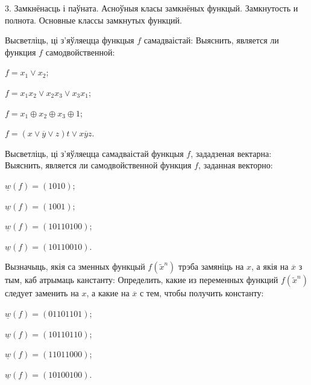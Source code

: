 \documentclass[12pt, a4paper]{article}
\begin{document}
\biLangHeader
{3. Замкнёнасць і паўната. Асноўныя класы замкнёных функцый.}
{Замкнутость и полнота. Основные классы замкнутых функций.}

\begin{problemList}

\problemItemWithCommonPart
{Высветліць, ці з'яўляецца функцыя $f$ самадваістай:}
{Выяснить, является ли функция $f$ самодвойственной:}
{%
\begin{belarusianEnumerateMulticol}
    \item $f=x_1\vee x_2$;
    \item $f=x_1x_2\vee x_2x_3\vee x_3x_1$;
    \item $f=x_1\oplus x_2\oplus x_3\oplus 1$;
    \item $f=(x\vee \overline{y}\vee z)t\vee x\overline{y}z$.
\end{belarusianEnumerateMulticol} 
}

\smallskip

\problemItemWithCommonPart
{Высветліць, ці з'яўляецца самадваістай функцыя $f$, зададзеная вектарна:}
{Выяснить, является ли самодвойственной функция $f$, заданная векторно:}
{%
\begin{belarusianEnumerateMulticol}
    \item $\underline{w}(f)=(1010)$;
    \item $\underline{w}(f)=(1001)$;
    \item $\underline{w}(f)=(10110100)$;
    \item $\underline{w}(f)=(10110010)$.
\end{belarusianEnumerateMulticol}
}

\smallskip

\problemItemWithCommonPart
{Вызначыць, якія са зменных функцый $f(\tilde x^n)$ трэба замяніць на $x$, 
а якія на $\overline{x}$ з тым, каб атрымаць канстанту:}
{Определить, какие из переменных функций $f(\tilde x^n)$ следует заменить на $x$,
а какие на $\overline{x}$ с тем, чтобы получить константу:}
{%
\begin{belarusianEnumerateMulticol}
    \item $\underline{w}(f)=(01101101)$;
    \item $\underline{w}(f)=(10110110)$;
    \item $\underline{w}(f)=(11011000)$;
    \item $\underline{w}(f)=(10100100)$.
\end{belarusianEnumerateMulticol}
}

\smallskip


\end{problemList}
\end{document}
